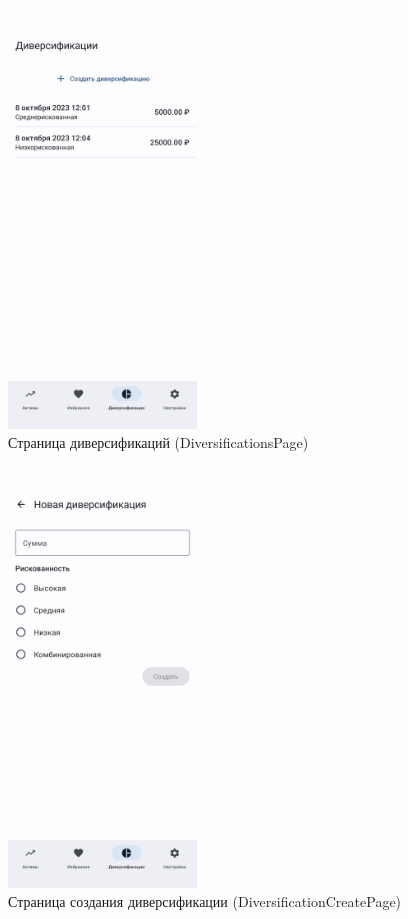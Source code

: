 \documentclass[a4paper, 14pt]{article}
\begin{document}
\begin{figure}[H]
    \centering
    \includegraphics[width=5cm]{resources/10.png}
    \caption{Страница диверсификаций (DiversificationsPage)}
\end{figure}

\begin{figure}[H]
    \centering
    \includegraphics[width=5cm]{resources/11.png}
    \caption{Страница создания диверсификации (DiversificationCreatePage)}
\end{figure}
\end{document}
